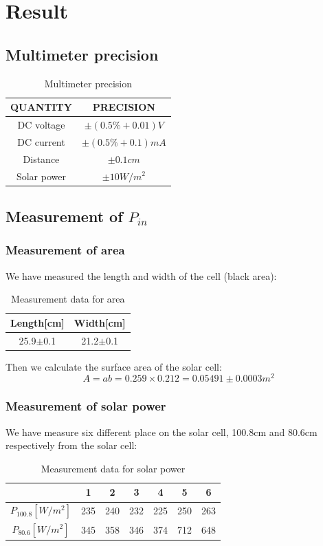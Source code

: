 \documentclass[12pt,a4paper]{article}
\begin{document}
\section{Result}
\subsection{Multimeter precision}
\begin{table}[H]
    \centering
    \begin{tabular}{|c|c|}
    \hline
    QUANTITY    & PRECISION \\ \hline
    DC voltage  & $\pm(0.5\%+0.01)V$ \\ \hline
    DC current  & $\pm(0.5\%+0.1)mA$ \\ \hline
    Distance    & $\pm 0.1cm$ \\ \hline
    Solar power & $\pm 10W/m^2$ \\ \hline
    \end{tabular}
    \caption{Multimeter precision}
\end{table}

\subsection{Measurement of $P_{in}$}
\subsubsection{Measurement of area}
We have measured the length and width of the cell (black area):
\begin{table}[H]
    \centering
    \begin{tabular}{|c|c|}
    \hline
    Length{[}cm{]} & Width{[}cm{]} \\ \hline
    25.9$\pm$0.1  & 21.2$\pm$0.1  \\ \hline
    \end{tabular}
    \caption{Measurement data for area}
\end{table}
Then we calculate the surface area of the solar cell:
$$A=ab=0.259\times 0.212=0.05491\pm 0.0003m^2$$

\subsubsection{Measurement of solar power}
We have measure six different place on the solar cell, 100.8cm and 80.6cm respectively from the solar cell:
\begin{table}[H]
    \centering
    \begin{tabular}{|c|c|c|c|c|c|c|}
    \hline
      & 1   & 2   & 3   & 4   & 5   & 6   \\ \hline
    $P_{100.8}[W/m^2]$ & 235 & 240 & 232 & 225 & 250 & 263 \\ \hline
    $P_{80.6}[W/m^2]$ & 345 & 358 & 346 & 374 & 712 & 648 \\ \hline
    \end{tabular}
    \caption{Measurement data for solar power}
\end{table}
\end{document}

